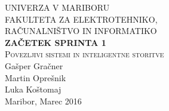 \documentclass[a4paper,11pt]{article}
\begin{document}
\begin{titlepage}


\newcommand{\HRule}{\rule{\linewidth}{0.5mm}} %

\center %
 

\textsc{ UNIVERZA V MARIBORU\\ FAKULTETA ZA ELEKTROTEHNIKO,\\RAČUNALNIŠTVO IN INFORMATIKO}\\[5cm] %

{ \huge \bfseries \textbf{ZAČETEK SPRINTA 1}}\\[0.4cm] %
\textsc{\large Povezljivi sistemi in inteligentne storitve}\\[5cm] %

{\large Gašper Gračner}\\[0.4cm]
{\large Martin Oprešnik}\\[0.4cm]
{\large Luka Koštomaj}\\[0.4cm] 

\vfill %
{\large Maribor, Marec 2016}\\[3cm] %
\end{titlepage}
\newpage

\end{document}
